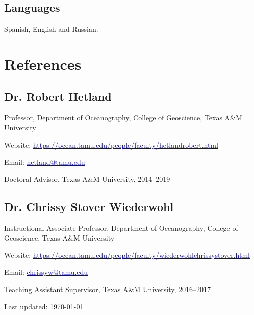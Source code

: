 \documentclass[10pt,letterpaper]{article}
\renewenvironment{itemize}{
  \begin{list}{}{
    \setlength{\leftmargin}{1.5em}
    \setlength{\itemsep}{0.25em}
    \setlength{\parskip}{0pt}
    \setlength{\parsep}{0.25em}
  }
}{
  \end{list}
}
\begin{document}
\subsection*{Languages}
\begin{itemize}
	\item Spanish, English and Russian.
\end{itemize}

\section*{References}
\subsection*{Dr. Robert Hetland}
\begin{itemize}
    \item Professor, Department of Oceanography, College of Geoscience, Texas A\&M University
    \item Website: \href{https://ocean.tamu.edu/people/faculty/hetlandrobert.html}{\textcolor{blue}{https://ocean.tamu.edu/people/faculty/hetlandrobert.html}}
    \item Email: \href{mailto:hetland@tamu.edu}{\textcolor{blue}{hetland@tamu.edu}}
    \item Doctoral Advisor, Texas A\&M University, 2014--2019
\end{itemize}

\subsection*{Dr. Chrissy Stover Wiederwohl}
\begin{itemize}
    \item Instructional Associate Professor, Department of Oceanography, College of Geoscience, Texas A\&M University
    \item Website: \href{https://ocean.tamu.edu/people/faculty/hetlandrobert.html}{\textcolor{blue}{https://ocean.tamu.edu/people/faculty/wiederwohlchrissystover.html}}
    \item Email: \href{mailto:chrissyw@tamu.edu}{\textcolor{blue}{chrissyw@tamu.edu}}
    \item Teaching Assistant Supervisor, Texas A\&M University, 2016--2017
\end{itemize}

\bigskip

\begin{center}
  \begin{small}
    Last updated: \today
  \end{small}
\end{center}
\end{document}
